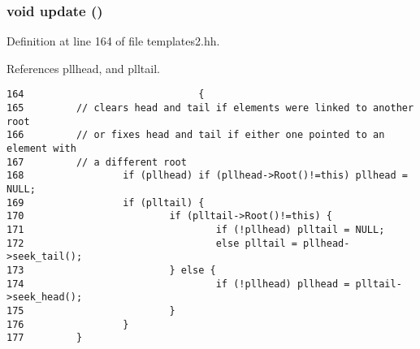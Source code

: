 \subsubsection{\setlength{\rightskip}{0pt plus 5cm}void update ()\hspace{0.3cm}{\tt  [inline]}}\label{templates2_8hh_a6}




Definition at line 164 of file templates2.hh.

References pllhead, and plltail.



\footnotesize\begin{verbatim}164                              {
165         // clears head and tail if elements were linked to another root
166         // or fixes head and tail if either one pointed to an element with
167         // a different root
168                 if (pllhead) if (pllhead->Root()!=this) pllhead = NULL;
169                 if (plltail) {
170                         if (plltail->Root()!=this) {
171                                 if (!pllhead) plltail = NULL;
172                                 else plltail = pllhead->seek_tail();
173                         } else {
174                                 if (!pllhead) pllhead = plltail->seek_head();
175                         }
176                 }
177         }
\end{verbatim}\normalsize 
